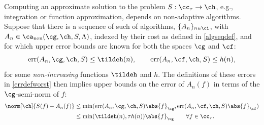 \documentclass[]{elsarticle}
\DeclareMathOperator{\fix}{non}
\DeclareMathOperator{\err}{err}
\theoremstyle{definition}
\theoremstyle{remark}
\newcommand{\Fnorm}[1]{\abs{#1}_{\cf}}
\newcommand{\Gnorm}[1]{\abs{#1}_{\cg}}
\begin{document}
Computing an approximate solution to the problem $S: \cc_{\tau} \to \ch$, e.g., integration or function approximation, depends on non-adaptive algorithms. Suppose that there is a sequence of such of algorithms, $\{A_n\}_{n \in \ci}$, with $A_n  \in \ca_{\fix}(\cg,\ch,S,\Lambda)$, indexed by their cost as defined in \eqref{algseqdef}, and for which upper error bounds are known for both the spaces $\cg$ and $\cf$:
\begin{equation}\label{algseqerrbd}
\err(A_n,\cg,\ch,S) \le \tildeh(n), \qquad \err(A_n,\cf,\ch,S) \le h(n), 
\end{equation}
for some \emph{non-increasing} functions $\tildeh$ and $h$.  The definitions of these errors in \eqref{errdefworst} then implies upper bounds on the error of $A_n(f)$ in terms of the $\cg$-semi-norm of $f$:
\begin{align} \nonumber
\norm[\ch]{S(f) -  A_n(f)} &\le \min(\err(A_n,\cg,\ch,S)\Gnorm{f},\err(A_n,\cf,\ch,S)\Fnorm{f}) \\
\label{Anerrbound}
&\le \min(\tildeh(n),\tau h(n))\Gnorm{f} \qquad \forall f \in \cc_{\tau}.
\end{align}
\end{document}
